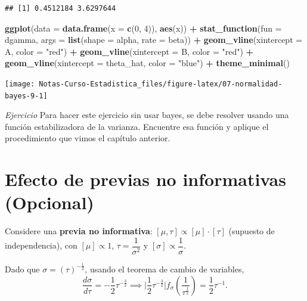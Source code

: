 \documentclass[
  12pt,
]{book}
\newenvironment{Shaded}{\begin{snugshade}}{\end{snugshade}}
\newcommand{\DataTypeTok}[1]{\textcolor[rgb]{0.13,0.29,0.53}{#1}}
\newcommand{\DecValTok}[1]{\textcolor[rgb]{0.00,0.00,0.81}{#1}}
\newcommand{\KeywordTok}[1]{\textcolor[rgb]{0.13,0.29,0.53}{\textbf{#1}}}
\newcommand{\NormalTok}[1]{#1}
\newcommand{\OperatorTok}[1]{\textcolor[rgb]{0.81,0.36,0.00}{\textbf{#1}}}
\newcommand{\StringTok}[1]{\textcolor[rgb]{0.31,0.60,0.02}{#1}}
\begin{document}
\begin{verbatim}
## [1] 0.4512184 3.6297644
\end{verbatim}

\begin{Shaded}
\begin{Highlighting}[]
\KeywordTok{ggplot}\NormalTok{(}\DataTypeTok{data =} \KeywordTok{data.frame}\NormalTok{(}\DataTypeTok{x =} \KeywordTok{c}\NormalTok{(}\DecValTok{0}\NormalTok{, }\DecValTok{4}\NormalTok{)), }\KeywordTok{aes}\NormalTok{(x)) }\OperatorTok{+}
\StringTok{  }\KeywordTok{stat\_function}\NormalTok{(}\DataTypeTok{fun =}\NormalTok{ dgamma, }\DataTypeTok{args =} \KeywordTok{list}\NormalTok{(}\DataTypeTok{shape =}\NormalTok{ alpha, }\DataTypeTok{rate =}\NormalTok{ beta)) }\OperatorTok{+}
\StringTok{  }\KeywordTok{geom\_vline}\NormalTok{(}\DataTypeTok{xintercept =}\NormalTok{ A, }\DataTypeTok{color =} \StringTok{"red"}\NormalTok{) }\OperatorTok{+}
\StringTok{  }\KeywordTok{geom\_vline}\NormalTok{(}\DataTypeTok{xintercept =}\NormalTok{ B, }\DataTypeTok{color =} \StringTok{"red"}\NormalTok{) }\OperatorTok{+}
\StringTok{  }\KeywordTok{geom\_vline}\NormalTok{(}\DataTypeTok{xintercept =}\NormalTok{ theta\_hat, }\DataTypeTok{color =} \StringTok{"blue"}\NormalTok{) }\OperatorTok{+}
\StringTok{  }\KeywordTok{theme\_minimal}\NormalTok{()}
\end{Highlighting}
\end{Shaded}

\begin{center}\texttt{[image: Notas-Curso-Estadistica\_files/figure-latex/07-normalidad-bayes-9-1]} \end{center}

\emph{Ejercicio} Para hacer este ejercicio sin usar bayes, se debe resolver usando
una función estabilizadora de la varianza. Encuentre esa función y aplique el
procedimiento que vimos el capítulo anterior.

\hypertarget{efecto-de-previas-no-informativas-opcional}{%
\section{Efecto de previas no informativas (Opcional)}\label{efecto-de-previas-no-informativas-opcional}}

Considere una \textbf{previa no informativa}: \([\mu,\tau] \propto [\mu]\cdot[\tau]\) (supuesto de
independencia), con \([\mu] \propto 1\), \(\tau = \dfrac1{\sigma^2}\) y \([\sigma] \propto \dfrac{1}{\sigma}\).

Dado que \(\sigma = (\tau)^{-\frac{1}2}\), usando el teorema de cambio de variables,
\[\dfrac{d\sigma}{d\tau} = -\dfrac12\tau^{-\frac32} \implies
\bigg|\dfrac12\tau^{-\frac32}\bigg|f_\sigma\left(\dfrac 1{\tau^{\frac12}}\right) = \dfrac
12 \tau^{-1}.\]
\end{document}
